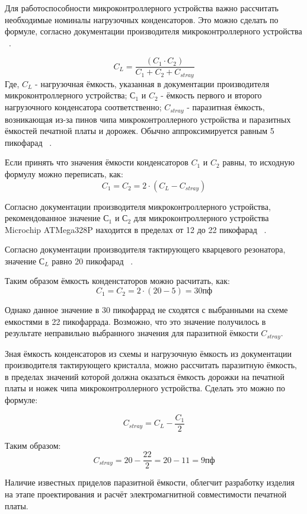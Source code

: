 Для работоспособности микроконтроллерного устройства важно рассчитать
необходимые номиналы нагрузочных конденсаторов. Это можно сделать по
формуле, согласно документации производителя микроконтроллерного
устройства ~\cite{microchip-Calculating-crystal-load-capacitor}.

\begin{equation}
  C_L = \frac{(C_1 \cdot C_2 )}{C_1 + C_2 + C_{stray}}
\end{equation}
Где,
$C_L$ - нагрузочная ёмкость, указанная в документации производителя микроконтроллерного устройства;
$С_1$ и $C_2$ - ёмкость первого и второго нагрузочного конденсатора соответственно;
$C_{stray}$ - паразитная ёмкость, возникающая из-за пинов чипа
микроконтроллерного устройства и паразитных ёмкостей печатной платы и
дорожек. Обычно аппроксимируется равным 5 пикофарад ~\cite{microchip-Calculating-crystal-load-capacitor}.

Если принять что значения ёмкости конденсаторов $C_1$ и $C_2$ равны,
то исходную формулу можно переписать, как:
\begin{equation}
  C_1 = C_2 = 2 \cdot (C_L - C_{stray})
\end{equation}


Согласно документации производителя микроконтроллерного устройства,
рекомендованное значение $С_1$ и $С_2$ для микроконтроллерного
устройства Microchip ATMega328P находится в пределах от 12 до
22 пикофарад ~\cite{microchip-atmega328p-datasheet}.

Согласно документации производителя тактирующего кварцевого резонатора, значение $С_L$ 
равно 20 пикофарад ~\cite{crystal-datasheet}.

Таким образом ёмкость конденстаторов можно расчитать, как:
$$C_1 = C_2 = 2 \cdot (20 - 5) = 30 пф$$

Однако данное значение в 30 пикофаррад не сходятся с выбранными на
схеме емкостями в 22 пикофаррада. Возможно, что это значение
получилось в результате неправильно выбранного значения для паразитной
ёмкости $C_{stray}$.

Зная ёмкость конденсаторов из схемы и нагрузочную ёмкость из
документации производителя тактирующего кристалла, можно
рассчитать паразитную ёмкость, в пределах значений которой должна
оказаться ёмкость дорожки на печатной платы и ножек чипа
микроконтроллерного устройства. Сделать это можно по формуле:

\begin{equation}
  C_{stray} = C_L - \frac{C_1}{2}
\end{equation}

Таким образом:
$$C_{stray} = 20 - \frac{22}{2} = 20 - 11 = 9 пф$$

Наличие известных приделов паразитной ёмкости, облегчит разработку
изделия на этапе проектирования и расчёт электромагнитной
совместимости печатной платы.

\newpage

